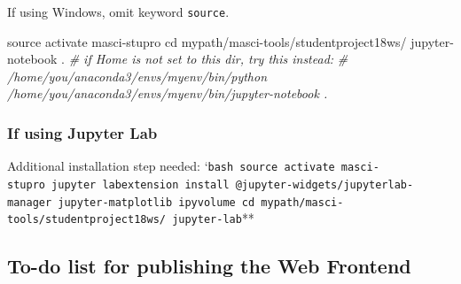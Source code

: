\documentclass[]{article}
\newenvironment{Shaded}{}{}
\newcommand{\CommentTok}[1]{\textcolor[rgb]{0.38,0.63,0.69}{\textit{#1}}}
\newcommand{\BuiltInTok}[1]{#1}
\newcommand{\ExtensionTok}[1]{#1}
\newcommand{\NormalTok}[1]{#1}
\begin{document}
If using Windows, omit keyword \texttt{source}.

\begin{Shaded}
\begin{Highlighting}[]
\BuiltInTok{source}\NormalTok{ activate masci-stupro}
\BuiltInTok{cd}\NormalTok{ mypath/masci-tools/studentproject18ws/}
\ExtensionTok{jupyter-notebook}\NormalTok{ .}
\CommentTok{# if Home is not set to this dir, try this instead:}
\CommentTok{# /home/you/anaconda3/envs/myenv/bin/python /home/you/anaconda3/envs/myenv/bin/jupyter-notebook .}
\end{Highlighting}
\end{Shaded}

\subsubsection{If using Jupyter Lab}\label{if-using-jupyter-lab}

Additional installation step needed:
`\texttt{bash\ source\ activate\ masci-stupro\ jupyter\ labextension\ install\ @jupyter-widgets/jupyterlab-manager\ jupyter-matplotlib\ ipyvolume\ cd\ mypath/masci-tools/studentproject18ws/\ jupyter-lab}**

\subsection{To-do list for publishing the Web
Frontend}\label{to-do-list-for-publishing-the-web-frontend}
\end{document}
